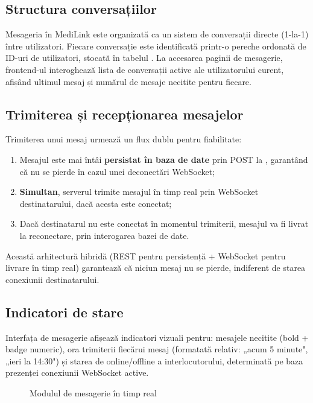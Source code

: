 \subsection{Structura conversațiilor}

Mesageria în MediLink este organizată ca un sistem de conversații directe (1-la-1) între utilizatori. Fiecare conversație este identificată printr-o pereche ordonată de ID-uri de utilizatori, stocată în tabelul . La accesarea paginii de mesagerie, frontend-ul interoghează lista de conversații active ale utilizatorului curent, afișând ultimul mesaj și numărul de mesaje necitite pentru fiecare.

\subsection{Trimiterea și recepționarea mesajelor}

Trimiterea unui mesaj urmează un flux dublu pentru fiabilitate:

\begin{enumerate}
  \item Mesajul este mai întâi \textbf{persistat în baza de date} prin POST la , garantând că nu se pierde în cazul unei deconectări WebSocket;
  \item \textbf{Simultan}, serverul trimite mesajul în timp real prin WebSocket destinatarului, dacă acesta este conectat;
  \item Dacă destinatarul nu este conectat în momentul trimiterii, mesajul va fi livrat la reconectare, prin interogarea bazei de date.
\end{enumerate}

Această arhitectură hibridă (REST pentru persistență + WebSocket pentru livrare în timp real) garantează că niciun mesaj nu se pierde, indiferent de starea conexiunii destinatarului.

\subsection{Indicatori de stare}

Interfața de mesagerie afișează indicatori vizuali pentru: mesajele necitite (bold + badge numeric), ora trimiterii fiecărui mesaj (formatată relativ: „acum 5 minute", „ieri la 14:30") și starea de online/offline a interlocutorului, determinată pe baza prezenței conexiunii WebSocket active.

\begin{figure}[H]
  \centering
  \caption{Modulul de mesagerie în timp real}
  \label{fig:mesagerie}
\end{figure}

